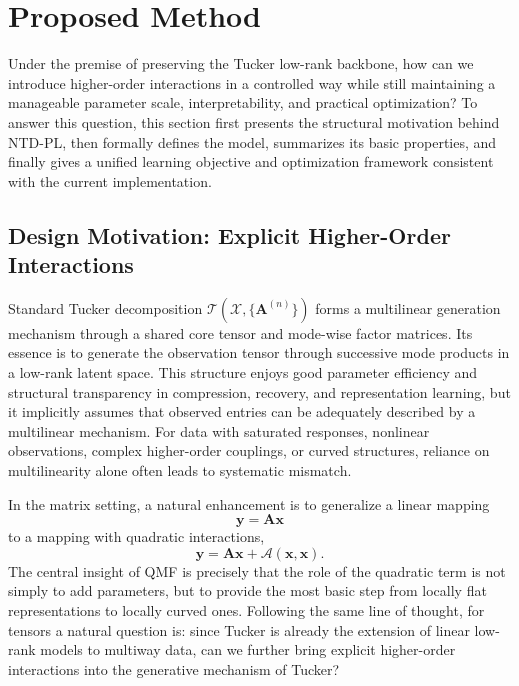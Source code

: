 \section{Proposed Method}
\label{sec:method}

Under the premise of preserving the Tucker low-rank backbone, how can we introduce higher-order interactions in a controlled way while still maintaining a manageable parameter scale, interpretability, and practical optimization? To answer this question, this section first presents the structural motivation behind NTD-PL, then formally defines the model, summarizes its basic properties, and finally gives a unified learning objective and optimization framework consistent with the current implementation.

\subsection{Design Motivation: Explicit Higher-Order Interactions}

Standard Tucker decomposition $\mathcal{T}(\mathcal{X},\{\mathbf{A}^{(n)}\})$ forms a multilinear generation mechanism through a shared core tensor and mode-wise factor matrices. Its essence is to generate the observation tensor through successive mode products in a low-rank latent space. This structure enjoys good parameter efficiency and structural transparency in compression, recovery, and representation learning, but it implicitly assumes that observed entries can be adequately described by a multilinear mechanism. For data with saturated responses, nonlinear observations, complex higher-order couplings, or curved structures, reliance on multilinearity alone often leads to systematic mismatch.

In the matrix setting, a natural enhancement is to generalize a linear mapping
\begin{equation}
\mathbf y = \mathbf A\mathbf x
\end{equation}
to a mapping with quadratic interactions,
\begin{equation}
\label{eq:qmf_motivation}
\mathbf y = \mathbf A\mathbf x + \mathcal A(\mathbf x,\mathbf x).
\end{equation}
The central insight of QMF \cite{zhai2024quadratic} is precisely that the role of the quadratic term is not simply to add parameters, but to provide the most basic step from locally flat representations to locally curved ones. Following the same line of thought, for tensors a natural question is: since Tucker is already the extension of linear low-rank models to multiway data, can we further bring explicit higher-order interactions into the generative mechanism of Tucker?

